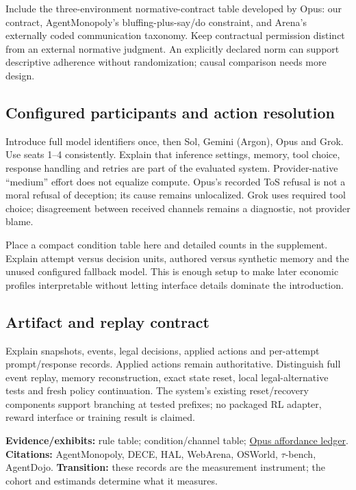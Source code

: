 Include the three-environment normative-contract table developed by Opus: our contract, AgentMonopoly's bluffing-plus-say/do constraint, and Arena's externally coded communication taxonomy. Keep contractual permission distinct from an external normative judgment. An explicitly declared norm can support descriptive adherence without randomization; causal comparison needs more design.

\subsection{Configured participants and action resolution}
Introduce full model identifiers once, then Sol, Gemini (Argon), Opus and Grok. Use seats 1--4 consistently. Explain that inference settings, memory, tool choice, response handling and retries are part of the evaluated system. Provider-native ``medium'' effort does not equalize compute. Opus's recorded ToS refusal is not a moral refusal of deception; its cause remains unlocalized. Grok uses required tool choice; disagreement between received channels remains a diagnostic, not provider blame.

Place a compact condition table here and detailed counts in the supplement. Explain attempt versus decision units, authored versus synthetic memory and the unused configured fallback model. This is enough setup to make later economic profiles interpretable without letting interface details dominate the introduction.

\subsection{Artifact and replay contract}
Explain snapshots, events, legal decisions, applied actions and per-attempt prompt/response records. Applied actions remain authoritative. Distinguish full event replay, memory reconstruction, exact state reset, local legal-alternative tests and fresh policy continuation. The system's existing reset/recovery components support branching at tested prefixes; no packaged RL adapter, reward interface or training result is claimed.

\textbf{Evidence/exhibits:} rule table; condition/channel table; \href{run:../opus/exhibits/affordance_ledger.md}{Opus affordance ledger}. \textbf{Citations:} AgentMonopoly, DECE, HAL, WebArena, OSWorld, \ensuremath{\tau}-bench, AgentDojo. \textbf{Transition:} these records are the measurement instrument; the cohort and estimands determine what it measures.

